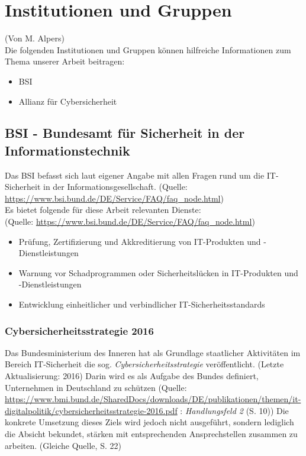 \chapter{Institutionen und Gruppen}
(Von M. Alpers)\\

Die folgenden Institutionen und Gruppen können hilfreiche Informationen zum Thema unserer Arbeit beitragen:

\begin{itemize}
	\item BSI
	\item Allianz für Cybersicherheit
\end{itemize}

\section{BSI - Bundesamt für Sicherheit in der Informationstechnik}

Das BSI befasst sich laut eigener Angabe \glqq{}mit allen Fragen rund um die IT-Sicherheit in der Informationsgesellschaft.\grqq{} (Quelle: \url{https://www.bsi.bund.de/DE/Service/FAQ/faq_node.html})\\

Es bietet folgende für diese Arbeit relevanten Dienste:\\
(Quelle: \url{https://www.bsi.bund.de/DE/Service/FAQ/faq_node.html})

\begin{itemize}
	\item \glqq{}Prüfung, Zertifizierung und Akkreditierung von IT-Produkten und -Dienstleistungen\grqq{}
	\item \glqq{}Warnung vor Schadprogrammen oder Sicherheitslücken in IT-Produkten und -Dienstleistungen\grqq{}
	\item \glqq{}Entwicklung einheitlicher und verbindlicher IT-Sicherheitsstandards\grqq{}
\end{itemize}

\subsection{Cybersicherheitsstrategie 2016}

Das Bundesministerium des Inneren hat als Grundlage staatlicher Aktivitäten im Bereich IT-Sicherheit die sog. \emph{Cybersicherheitsstrategie} veröffentlicht. (Letzte Aktualisierung: 2016) Darin wird es als Aufgabe des Bundes definiert, \glqq{}Unternehmen in Deutschland zu schützen\grqq{} (Quelle: \url{https://www.bmi.bund.de/SharedDocs/downloads/DE/publikationen/themen/it-digitalpolitik/cybersicherheitsstrategie-2016.pdf} : \emph{Handlungsfeld 2} (S. 10)) Die konkrete Umsetzung dieses Ziels wird jedoch nicht ausgeführt, sondern lediglich die Absicht bekundet, stärken mit entsprechenden Ansprechstellen zusammen zu arbeiten. (Gleiche Quelle, S. 22)\\

